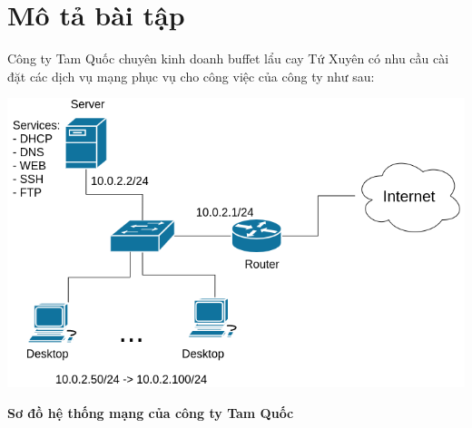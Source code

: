 \documentclass[a4paper]{article} %
\renewcommand{\figurename}{\fontsize{12pt}{0pt}\selectfont \bfseries Hình}
\begin{document}


\tableofcontents
\thispagestyle{empty}
\cleardoublepage


{
  \let\oldnumberline\numberline
  \renewcommand{\numberline}{\figurename~\oldnumberline}
  \listoffigures
}
\cleardoublepage


\section*{Mô tả bài tập}

Công ty Tam Quốc chuyên kinh doanh buffet lẩu cay Tứ Xuyên có nhu cầu cài đặt
các dịch vụ mạng phục vụ cho công việc của công ty như sau:

\setcounter{section}{0}
\setcounter{subsection}{1}
\setcounter{figure}{0}
\begin{minipage}{.93\linewidth}
  \captionsetup{type=figure}
  \includegraphics[width=\linewidth]{./imgs/Hinh-1.png}
  \caption{\bfseries Sơ đồ hệ thống mạng của công ty Tam Quốc}
\end{minipage}

\renewcommand{\arraystretch}{1.5}
\setcounter{subsection}{0}

\newpage
\end{document}
